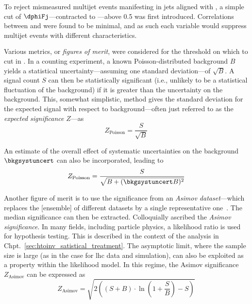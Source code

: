 To reject mismeasured multijet events manifesting in \glspl{jet} aligned with \ptmiss, a simple cut of $\dphiFj$---contracted to \mindphi---above 0.5 was first introduced. Correlations between \mindphi and \omegaTilde were found to be minimal, and as such each variable would suppress multijet events with different characteristics.

Various metrics, or \emph{figures of merit}, were considered for the threshold on which to cut in \omegaTilde. In a counting experiment, a known Poisson-distributed background $B$ yields a statistical uncertainty---assuming one standard deviation---of $\sqrt{B}$. A signal count $S$ can then be statistically significant (i.e., unlikely to be a statistical fluctuation of the background) if it is greater than the uncertainty on the background. This, somewhat simplistic, method gives the standard deviation for the expected signal with respect to background---often just referred to as the \emph{expected significance} $Z$---as
\begin{equation}
Z_{\mathrm{Poisson}} = \frac{S}{\sqrt{B}}
\label{eq:s_over_root_b}
\end{equation}

An estimate of the overall effect of systematic uncertainties on the background $\bkgsystuncert$ can also be incorporated, leading to
\begin{equation}
Z_{\mathrm{Poisson}} = \frac{S}{\sqrt{B + (\bkgsystuncert B)^2}}
\label{eq:s_over_root_b_systs}
\end{equation}

Another figure of merit is to use the significance from an \emph{Asimov dataset}---which replaces the [ensemble] of different datasets by a single representative one~\cite{Cowan:2010js}. The median significance can then be extracted. Colloquially ascribed the \emph{Asimov significance}. In many fields, including particle physics, a likelihood ratio is used for hypothesis testing. This is described in the context of the analysis in Chpt.~\ref{sec:htoinv_satistical_treatment}. The asymptotic limit, where the sample size is large (as in the case for \acrshort{lhc} data and simulation), can also be exploited as a property within the likelihood model. In this regime, the Asimov significance $Z_{\mathrm{Asimov}}$ can be expressed as  %
\begin{equation}
Z_{\mathrm{Asimov}} = \sqrt{2 \left( (S + B) \cdot \ln\left(1 + \frac{S}{B} \right) - S \right)}
\label{eq:asimov_significance}
\end{equation}

